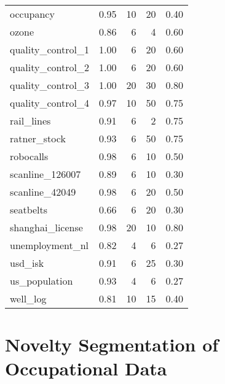 \begin{table}[H]
\begin{tabular}{lrrrr}
    occupancy &  0.95 &   10 &   20 &  0.40 \\
    ozone &  0.86 &    6 &    4 &  0.60 \\
    quality\_control\_1 &  1.00 &    6 &   20 &  0.60 \\
    quality\_control\_2 &  1.00 &    6 &   20 &  0.60 \\
    quality\_control\_3 &  1.00 &   20 &   30 &  0.80 \\
    quality\_control\_4 &  0.97 &   10 &   50 &  0.75 \\
    rail\_lines &  0.91 &    6 &    2 &  0.75 \\
    ratner\_stock &  0.93 &    6 &   50 &  0.75 \\
    robocalls &  0.98 &    6 &   10 &  0.50 \\
    scanline\_126007 &  0.89 &    6 &   10 &  0.30 \\
    scanline\_42049 &  0.98 &    6 &   20 &  0.50 \\
    seatbelts &  0.66 &    6 &   20 &  0.30 \\
    shanghai\_license &  0.98 &   20 &   10 &  0.80 \\
    unemployment\_nl &  0.82 &    4 &    6 &  0.27 \\
    usd\_isk &  0.91 &    6 &   25 &  0.30 \\
    us\_population &  0.93 &    4 &    6 &  0.27 \\
    well\_log &  0.81 &   10 &   15 &  0.40 \\
    \bottomrule
    \end{tabular}
\end{table}

\section{Novelty Segmentation of Occupational Data}
\label{append:novelty_occupational}


